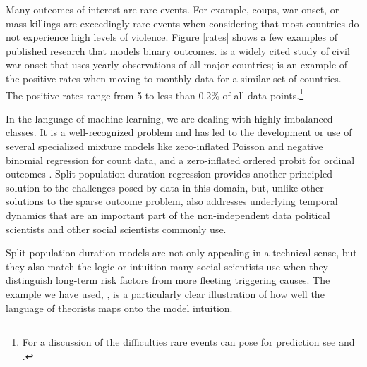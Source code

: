 Many outcomes of interest are rare events. For example, coups, war
onset, or mass killings are exceedingly rare events when considering
that most countries do not experience high levels of violence. Figure
\ref{rates} shows a few examples of published research that models
binary outcomes. \citet{fearon2003ethnicity} is a widely cited study of
civil war onset that uses yearly observations of all major countries;
\citet{beger2014ensemble} is an example of the positive rates when
moving to monthly data for a similar set of countries. The positive
rates range from 5 to less than 0.2\% of all data points.\footnote{For a
  discussion of the difficulties rare events can pose for prediction see
  \citet{king2001explaining} and \citet{king2001logistic}.}

In the language of machine learning, we are dealing with highly
imbalanced classes. It is a well-recognized problem and has led to the
development or use of several specialized mixture models like
zero-inflated Poisson and negative binomial regression for count data,
and a zero-inflated ordered probit for ordinal outcomes \citep{bagozzi2015modeling}. Split-population duration regression provides another principled
solution to the challenges posed by data in this domain, but, unlike
other solutions to the sparse outcome problem, also addresses underlying
temporal dynamics that are an important part of the non-independent data
political scientists and other social scientists commonly use.

Split-population duration models are not only appealing in a technical
sense, but they also match the logic or intuition many social scientists
use when they distinguish long-term risk factors from more fleeting
triggering causes. The example we have used, \citet{belkin2003toward},
is a particularly clear illustration of how well the language of
theorists maps onto the model intuition.


\newpage
\address{Andreas Beger\\
  Ward Associates / Predictive Heuristics\\
  Tallinn\\
  Estonia\\
  }

\address{Daniel W. Hill, Jr.\\
  Department of International Affairs\\
  University of Georgia\\
  Athens, GA\\
  United States of America\\
  }

